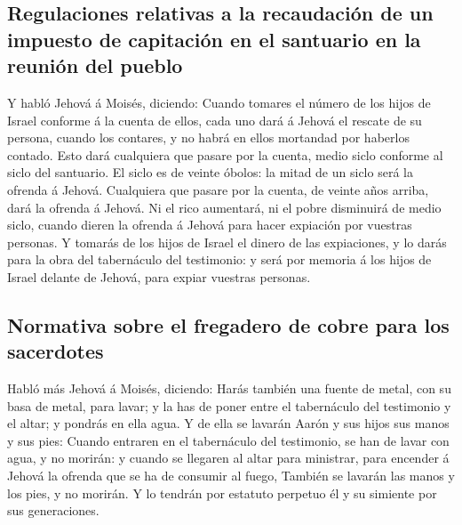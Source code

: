 \hypertarget{regulaciones-relativas-a-la-recaudaciuxf3n-de-un-impuesto-de-capitaciuxf3n-en-el-santuario-en-la-reuniuxf3n-del-pueblo}{%
\subsection{Regulaciones relativas a la recaudación de un impuesto de
capitación en el santuario en la reunión del
pueblo}\label{regulaciones-relativas-a-la-recaudaciuxf3n-de-un-impuesto-de-capitaciuxf3n-en-el-santuario-en-la-reuniuxf3n-del-pueblo}}

 Y habló Jehová á Moisés, diciendo:  Cuando
tomares el número de los hijos de Israel conforme á la cuenta de ellos,
cada uno dará á Jehová el rescate de su persona, cuando los contares, y
no habrá en ellos mortandad por haberlos contado.  Esto
dará cualquiera que pasare por la cuenta, medio siclo conforme al siclo
del santuario. El siclo es de veinte óbolos: la mitad de un siclo será
la ofrenda á Jehová.  Cualquiera que pasare por la cuenta,
de veinte años arriba, dará la ofrenda á Jehová.  Ni el
rico aumentará, ni el pobre disminuirá de medio siclo, cuando dieren la
ofrenda á Jehová para hacer expiación por vuestras personas.
 Y tomarás de los hijos de Israel el dinero de las
expiaciones, y lo darás para la obra del tabernáculo del testimonio: y
será por memoria á los hijos de Israel delante de Jehová, para expiar
vuestras personas.

\hypertarget{normativa-sobre-el-fregadero-de-cobre-para-los-sacerdotes}{%
\subsection{Normativa sobre el fregadero de cobre para los
sacerdotes}\label{normativa-sobre-el-fregadero-de-cobre-para-los-sacerdotes}}

 Habló más Jehová á Moisés, diciendo:  Harás
también una fuente de metal, con su basa de metal, para lavar; y la has
de poner entre el tabernáculo del testimonio y el altar; y pondrás en
ella agua.  Y de ella se lavarán Aarón y sus hijos sus
manos y sus pies:  Cuando entraren en el tabernáculo del
testimonio, se han de lavar con agua, y no morirán: y cuando se llegaren
al altar para ministrar, para encender á Jehová la ofrenda que se ha de
consumir al fuego,  También se lavarán las manos y los
pies, y no morirán. Y lo tendrán por estatuto perpetuo él y su simiente
por sus generaciones.

